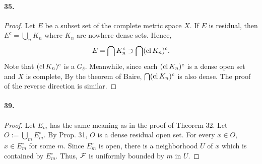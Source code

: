 \paragraph{35.}
\begin{proof}
  Let $E$ be a subset set of the complete metric space $X$. If $E$ is residual,
  then $E^c = \bigcup_n K_n$ where $K_n$ are nowhere dense sets. Hence, 
  \[
    E = \bigcap K_n^c \supset \bigcap (\operatorname{cl} K_n)^c.
  \]
  Note that $(\operatorname{cl} K_n)^c$ is a $G_\delta$. Meanwhile, since each $(\operatorname{cl} K_n)^c$
  is a dense open set and $X$ is complete, By the theorem of Baire, 
  $\bigcap (\operatorname{cl} K_n)^c$ is also dense. The proof of the reverse direction is
  similar.
\end{proof}

\paragraph{39.}
\begin{proof}
  Let $E_m$ has the same meaning as in the proof of Theorem 32. Let $O := 
  \bigcup_m E_m^\circ$. By Prop. 31, $O$ is a dense residual open set. For
  every $x\in O$, $x \in E_m^\circ$ for some $m$. Since $E_m^\circ$ is open,
  there is a neighborhood $U$ of $x$ which is contained by $E_m^\circ$. Thus,
  $\mathcal{F}$ is uniformly bounded by $m$ in $U$.
\end{proof}











